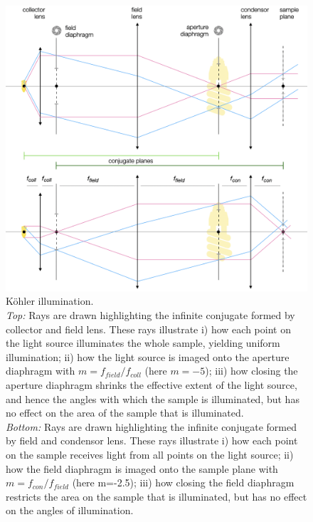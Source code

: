 \documentclass[a4paper]{report}
\begin{document}
\begin{figure}[h]
	\center
	\includegraphics[width=1\textwidth]{figures/koehler_illumination.png}
	\captionsetup{width=0.95\textwidth}
	\caption{K\"{o}hler illumination. \\
	\emph{Top:} Rays are drawn highlighting the infinite conjugate formed by collector and field lens. These rays illustrate i) how each point on the light source illuminates the whole sample, yielding uniform illumination; ii) how the light source is imaged onto the aperture diaphragm with $m=f_{field}/f_{coll}$ (here $m=-5$); iii) how closing the aperture diaphragm shrinks the effective extent of the light source, and hence the angles with which the sample is illuminated, but has no effect on the area of the sample that is illuminated. \\
	\emph{Bottom:} Rays are drawn highlighting the infinite conjugate formed by field and condensor lens. These rays illustrate i) how each point on the sample receives light from all points on the light source; ii) how the field diaphragm is imaged onto the sample plane with $m=f_{con}/f_{field}$ (here m=-2.5); iii) how closing the field diaphragm restricts the area on the sample that is illuminated, but has no effect on the angles of illumination.}
	\label{fig:koehler_illumination}
\end{figure}
\end{document}
